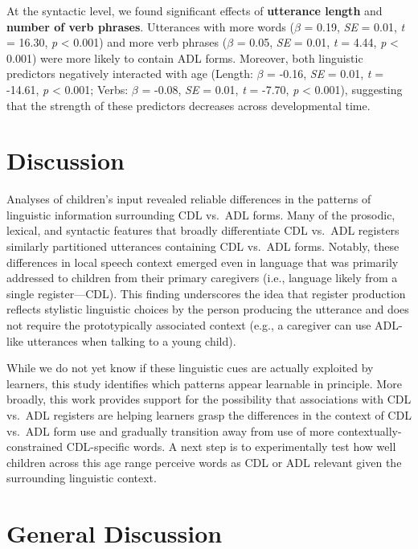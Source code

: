 \documentclass[10pt, letterpaper]{article}
\begin{document}
At the syntactic level, we found significant effects of
\textbf{utterance length} and \textbf{number of verb phrases}.
Utterances with more words (\(\beta\) = 0.19, \emph{SE} = 0.01, \emph{t}
= 16.30, \emph{p} \textless{} 0.001) and more verb phrases (\(\beta\) =
0.05, \emph{SE} = 0.01, \emph{t} = 4.44, \emph{p} \textless{} 0.001)
were more likely to contain ADL forms. Moreover, both linguistic
predictors negatively interacted with age (Length: \(\beta\) = -0.16,
\emph{SE} = 0.01, \emph{t} = -14.61, \emph{p} \textless{} 0.001; Verbs:
\(\beta\) = -0.08, \emph{SE} = 0.01, \emph{t} = -7.70, \emph{p}
\textless{} 0.001), suggesting that the strength of these predictors
decreases across developmental time.

\hypertarget{discussion-1}{%
\section{Discussion}\label{discussion-1}}

Analyses of children's input revealed reliable differences in the
patterns of linguistic information surrounding CDL vs.~ADL forms. Many
of the prosodic, lexical, and syntactic features that broadly
differentiate CDL vs.~ADL registers similarly partitioned utterances
containing CDL vs.~ADL forms. Notably, these differences in local speech
context emerged even in language that was primarily addressed to
children from their primary caregivers (i.e., language likely from a
single register---CDL). This finding underscores the idea that register
production reflects stylistic linguistic choices by the person producing
the utterance and does not require the prototypically associated context
(e.g., a caregiver can use ADL-like utterances when talking to a young
child).

While we do not yet know if these linguistic cues are actually exploited
by learners, this study identifies which patterns appear learnable in
principle. More broadly, this work provides support for the possibility
that associations with CDL vs.~ADL registers are helping learners grasp
the differences in the context of CDL vs.~ADL form use and gradually
transition away from use of more contextually-constrained CDL-specific
words. A next step is to experimentally test how well children across
this age range perceive words as CDL or ADL relevant given the
surrounding linguistic context.

\hypertarget{general-discussion}{%
\section{General Discussion}\label{general-discussion}}
\end{document}
